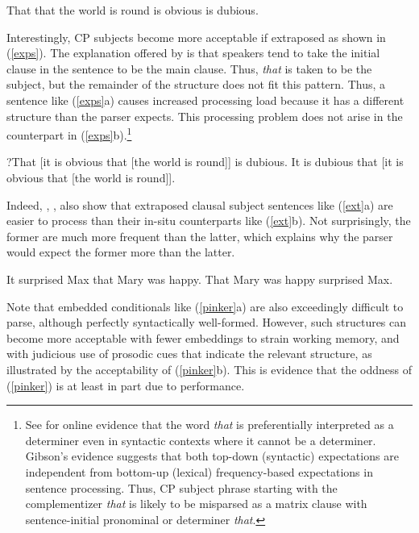\documentclass[output=paper]{langsci/langscibook}
\begin{document}
 \ex \bad{*}That that the world is round is obvious is dubious.\\
\citep{kuno74}
\z \label{that}
\z



 Interestingly, CP subjects become more acceptable if  extraposed as shown in (\ref{exps}).
The explanation offered by  \citet[356--357]{fod74} is that speakers tend to  take the initial clause in the sentence  to be the  main clause. Thus, \emph{that} is taken to be the subject, but the remainder
of the structure does not fit this pattern. Thus, a sentence like (\ref{exps}a) causes
 increased  processing  load  because  it has a  different structure 
than the parser expects.
This processing problem does not arise
in the counterpart in (\ref{exps}b).\footnote{See  \citet{gibson07} for online evidence
that  the word \emph{that} is preferentially interpreted as a determiner even in syntactic contexts where it cannot be a determiner. 
 Gibson's evidence suggests that both top-down (syntactic) expectations are independent from bottom-up (lexical) frequency-based expectations in sentence processing. Thus, 
CP subject phrase  starting with the complementizer
\emph{that} is likely to be misparsed as a matrix clause with sentence-initial  pronominal or determiner \emph{that}.}



\ea
\ea ?That [it is obvious that [the world is round]] is dubious.
\ex It is dubious that [it is obvious that [the world is round]].\\
\citep{kuno74}
\z \label{exps}
\z


\noindent
  Indeed, \citet{fodor67},  \citet{bever}, \citet{frazier88} also
 show that extraposed clausal subject sentences
 like (\ref{ext}a) are easier to process than
their in-situ counterparts like (\ref{ext}b). 
Not surprisingly,  the former are much more frequent than the latter,
which  explains why the parser would expect the former more than the latter.


\ea
\ea It surprised Max that Mary was happy. 
\ex That Mary was happy surprised Max.
\z \label{ext}
\z






\noindent
Note that embedded conditionals like (\ref{pinker}a) are also exceedingly 
difficult to parse, although perfectly syntactically well-formed.
However,   such structures can become more acceptable with fewer embeddings to strain
working memory, and with judicious use of prosodic cues that indicate  the relevant structure, as illustrated by  the acceptability of (\ref{pinker}b).
This is  evidence that the oddness of (\ref{pinker}) is
at least in part due to performance. 
\end{document}
